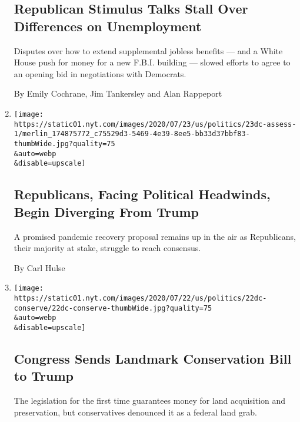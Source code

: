\begin{enumerate}
  \hypertarget{republican-stimulus-talks-stall-over-differences-on-unemployment}{%
  \subsection{Republican Stimulus Talks Stall Over Differences on
  Unemployment}\label{republican-stimulus-talks-stall-over-differences-on-unemployment}}

  Disputes over how to extend supplemental jobless benefits --- and a
  White House push for money for a new F.B.I. building --- slowed
  efforts to agree to an opening bid in negotiations with Democrats.

  By Emily Cochrane, Jim Tankersley and Alan Rappeport
\item
  \href{/2020/07/23/us/trump-republicans-coronavirus-stimulus.html}{}

  \texttt{[image: https://static01.nyt.com/images/2020/07/23/us/politics/23dc-assess-1/merlin\_174875772\_c75529d3-5469-4e39-8ee5-bb33d37bbf83-thumbWide.jpg?quality=75\\\&auto=webp\\\&disable=upscale]}

  \hypertarget{republicans-facing-political-headwinds-begin-diverging-from-trump}{%
  \subsection{Republicans, Facing Political Headwinds, Begin Diverging
  From
  Trump}\label{republicans-facing-political-headwinds-begin-diverging-from-trump}}

  A promised pandemic recovery proposal remains up in the air as
  Republicans, their majority at stake, struggle to reach consensus.

  By Carl Hulse
\item
  \href{/2020/07/22/us/politics/land-water-conservation-fund.html}{}

  \texttt{[image: https://static01.nyt.com/images/2020/07/22/us/politics/22dc-conserve/22dc-conserve-thumbWide.jpg?quality=75\\\&auto=webp\\\&disable=upscale]}

  \hypertarget{congress-sends-landmark-conservation-bill-to-trump}{%
  \subsection{Congress Sends Landmark Conservation Bill to
  Trump}\label{congress-sends-landmark-conservation-bill-to-trump}}

  The legislation for the first time guarantees money for land
  acquisition and preservation, but conservatives denounced it as a
  federal land grab.


\end{enumerate}
